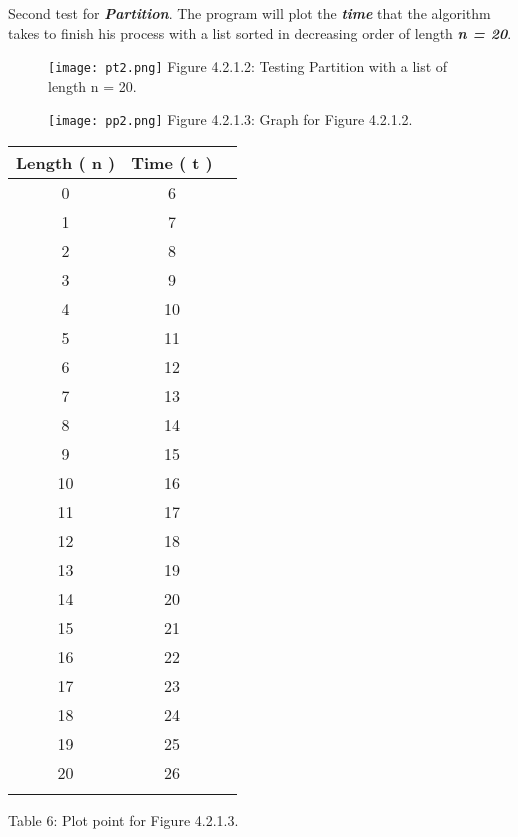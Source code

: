 \pagebreak

Second test for {\bfseries\itshape Partition}. The program will plot the {\bfseries\itshape time} that the algorithm takes to finish his process with a list sorted in decreasing order of length {\bfseries\itshape n = 20}. \hfill \break

\begin{figure}[H]
\texttt{[image: pt2.png]}
\centering \linebreak \linebreak Figure 4.2.1.2: Testing Partition with a list of length n = 20.
\end{figure} \hfill

\begin{multicols}{2}
\begin{figure}[H]
\texttt{[image: pp2.png]}
\centering \linebreak \linebreak Figure 4.2.1.3: Graph for Figure 4.2.1.2.
\end{figure}

\begin{center}
\begin{itemize}

\end{itemize}
\begin{tabular}[.5cm]{ c c c }
\toprule
Length ( n ) & Time ( t ) \\
\midrule
0 & 6 \\
\cmidrule {1-2}
1 & 7 \\
\cmidrule {1-2}
2 & 8 \\
\cmidrule {1-2}
3 & 9 \\
\cmidrule {1-2}
4 & 10 \\
\cmidrule {1-2}
5 & 11 \\
\cmidrule {1-2}
6 & 12 \\
\cmidrule {1-2}
7 & 13 \\
\cmidrule {1-2}
8 & 14 \\
\cmidrule {1-2}
9 & 15 \\
\cmidrule {1-2}
10 & 16 \\
\cmidrule {1-2}
11 & 17 \\
\cmidrule {1-2}
12 & 18 \\
\cmidrule {1-2}
13 & 19 \\
\cmidrule {1-2}
14 & 20 \\
\cmidrule {1-2}
15 & 21 \\
\cmidrule {1-2}
16 & 22 \\
\cmidrule {1-2}
17 & 23 \\
\cmidrule {1-2}
18 & 24 \\
\cmidrule {1-2}
19 & 25 \\
\cmidrule {1-2}
20 & 26 \\
\bottomrule
\linebreak
\end{tabular}
\linebreak \linebreak Table 6: Plot point for Figure 4.2.1.3.
\end{center}
\end{multicols} \hfill

